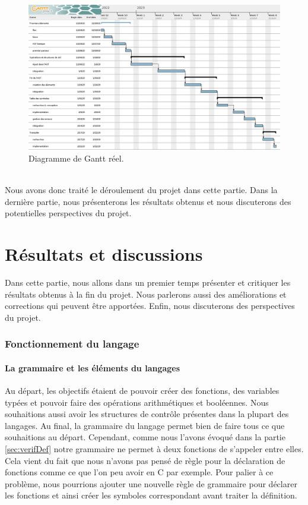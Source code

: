 \documentclass[a4paper]{article}%
\begin{document}
\begin{figure}[h!]
  \begin{center}
  \includegraphics[scale=0.35]{./img/real-project.png}
  \caption{Diagramme de Gantt réel.}
  \end{center}
\end{figure}~\\

Nous avons donc traité le déroulement du projet dans cette partie. Dans la
dernière partie, nous présenterons les résultats obtenus et nous discuterons des
potentielles perspectives du projet.

\clearpage
\part{Résultats et discussions}

Dans cette partie, nous allons dans un premier temps présenter et critiquer les
résultats obtenus à la fin du projet. Nous parlerons aussi des améliorations et
corrections qui peuvent être apportées. Enfin, nous discuterons des perspectives
du projet.

\section{Fonctionnement du langage}

\subsection{La grammaire et les éléments du langages}

Au départ, les objectifs étaient de pouvoir créer des fonctions, des variables
typées et pouvoir faire des opérations arithmétiques et booléennes. Nous
souhaitions aussi avoir les structures de contrôle présentes dans la plupart des
langages. Au final, la grammaire du langage permet bien de faire tous ce que
souhaitions au départ. Cependant, comme nous l'avons évoqué dans la partie
\ref{sec:verifDef} notre grammaire ne permet à deux fonctions de s'appeler entre
elles. Cela vient du fait que nous n'avons pas pensé de règle pour la
déclaration de fonctions comme ce que l'on peu avoir en C par exemple. Pour
palier à ce problème, nous pourrions ajouter une nouvelle règle de grammaire
pour déclarer les fonctions et ainsi créer les symboles correspondant avant
traiter la définition.\\
\end{document}
